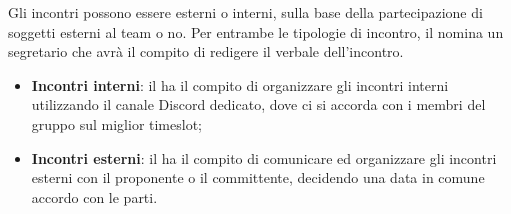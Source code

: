 Gli incontri possono essere esterni o interni, sulla base della partecipazione di soggetti esterni al team o no. Per entrambe le tipologie di incontro, il \respProg{} nomina un segretario che avrà il compito di redigere il verbale dell'incontro.
\begin{itemize}
\item \textbf{Incontri interni}: il \respProg{} ha il compito di organizzare gli incontri interni utilizzando il canale Discord dedicato, dove ci si accorda con i membri del gruppo sul miglior timeslot;
\item \textbf{Incontri esterni}: il \respProg{} ha il compito di comunicare ed organizzare gli incontri esterni con il proponente o il committente, decidendo una data in comune accordo con le parti.
\end{itemize}